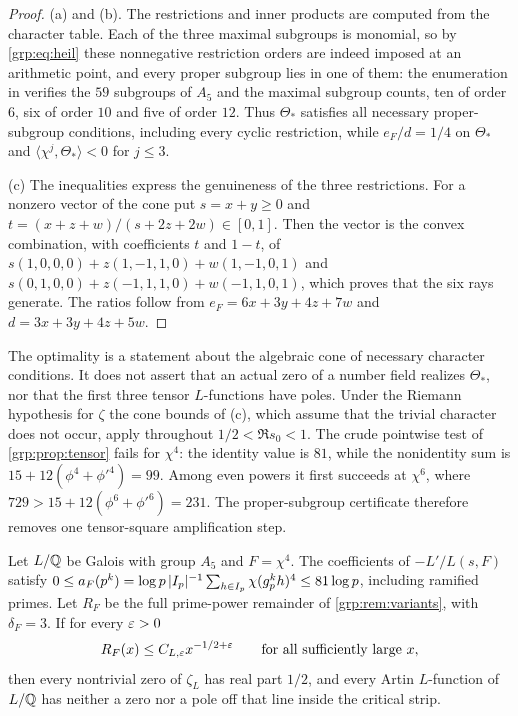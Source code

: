 \begin{proof}
(a) and (b). The restrictions and inner products are computed from the
character table. Each of the three maximal subgroups is monomial, so by
\eqref{grp:eq:heil} these nonnegative restriction orders are indeed imposed at
an arithmetic point, and every proper subgroup lies in one of them: the
enumeration in
 verifies
the $59$ subgroups of $A_5$ and the maximal subgroup counts, ten of order $6$,
six of order $10$ and five of order $12$. Thus $\Theta_*$ satisfies all
necessary proper-subgroup conditions, including every cyclic restriction,
while $e_F/d=1/4$ on $\Theta_*$ and $\langle\chi^j,\Theta_*\rangle<0$ for
$j\le3$.

(c) The inequalities express the genuineness of the three restrictions. For a
nonzero vector of the cone put $s=x+y\ge0$ and
$t=(x+z+w)/(s+2z+2w)\in[0,1]$. Then the vector is the convex combination, with
coefficients $t$ and $1-t$, of
$s(1,0,0,0)+z(1,-1,1,0)+w(1,-1,0,1)$ and
$s(0,1,0,0)+z(-1,1,1,0)+w(-1,1,0,1)$, which proves that the six rays generate.
The ratios follow from $e_F=6x+3y+4z+7w$ and $d=3x+3y+4z+5w$.
\end{proof}

The optimality is a statement about the algebraic cone of necessary character
conditions. It does not assert that an actual zero of a number field realizes
$\Theta_*$, nor that the first three tensor $L$-functions have poles. Under the
Riemann hypothesis for $\zeta$ the cone bounds of (c), which assume that the
trivial character does not occur, apply throughout $1/2<\Re s_0<1$. The crude
pointwise test of \cref{grp:prop:tensor} fails for $\chi^4$: the identity
value is $81$, while the nonidentity sum is $15+12(\phi^4+\phi'^4)=99$. Among
even powers it first succeeds at $\chi^6$, where
$729>15+12(\phi^6+\phi'^6)=231$. The proper-subgroup certificate therefore
removes one tensor-square amplification step.

\begin{theorem}\label{grp:thm:a5-target}
Let $L/\mathbb{Q}$ be Galois with group $A_5$ and $F=\chi^4$. The coefficients of
$-L'/L(s,F)$ satisfy
$0\le a_F(p^k)=\log p\,\lvert I_p\rvert^{-1}\sum_{h\in I_p}\chi(g_p^kh)^4\le81\log p$,
including ramified primes. Let $R_F$ be the full prime-power remainder of
\cref{grp:rem:variants}, with $\delta_F=3$. If for every $\varepsilon>0$
\[
 R_F(x)\le C_{L,\varepsilon}x^{-1/2+\varepsilon}\qquad\text{for all sufficiently large }x,
\]
then every nontrivial zero of $\zeta_L$ has real part $1/2$, and every Artin
$L$-function of $L/\mathbb{Q}$ has neither a zero nor a pole off that line inside the
critical strip.
\end{theorem}

